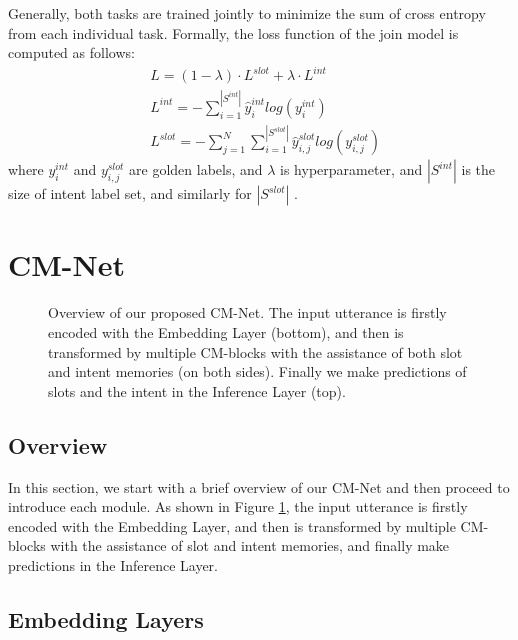 \documentclass[11pt,a4paper]{article}
\begin{document}
Generally, both tasks are trained jointly to minimize the sum of cross entropy from each individual task. Formally, the loss function of the join model is computed as follows:
\begin{equation}
    \begin{split}
    & L = (1 - \lambda) \cdot L^{slot} + \lambda \cdot L^{int} \\
    & L^{int} = - \sum\limits_{i=1}^{|S^{int}|}{\hat{y}^{int}_i} log(y^{int}_i) \\
    & L^{slot} = - \sum\limits_{j=1}^{N}\sum\limits_{i=1}^{|S^{slot}|}{\hat{y}^{slot}_{i,j}} log(y^{slot}_{i,j})
    \end{split}
\end{equation}
where $y^{int}_i$ and $y^{slot}_{i,j}$ are golden labels,
and $\lambda$ is hyperparameter,
and $|S^{int}|$ is the size of intent label set,
and similarly for $|S^{slot}|$ .



\section{CM-Net}
\begin{figure}[t!]
\begin{center}
      \vspace{-19pt}
      \caption{Overview of our proposed CM-Net.
      The input utterance is firstly encoded with the Embedding Layer (bottom), and then is transformed by multiple CM-blocks with the assistance of both slot and intent memories (on both sides). Finally we make predictions of slots and the intent in the Inference Layer (top).
      }\vspace{-10pt}
      \label{overview}  
 \end{center}
\end{figure}

\subsection{Overview}
In this section, we start with a brief overview of our CM-Net and then proceed to introduce each module. As shown in Figure \ref{overview}, the input utterance is firstly encoded with the Embedding Layer, and then is transformed by multiple CM-blocks with the assistance of slot and intent memories, and finally make predictions in the Inference Layer.

\subsection{Embedding Layers}
\end{document}
